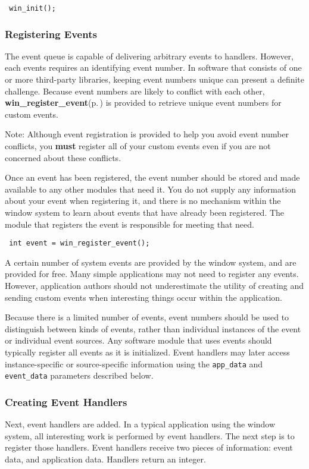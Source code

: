 \footnotesize\begin{verbatim} win_init();
\end{verbatim}
\normalsize
\subsubsection{Registering Events}\label{winevent_8h_regevent}
The event queue is capable of delivering arbitrary events to handlers. However, each events requires an identifying event number. In software that consists of one or more third-party libraries, keeping event numbers unique can present a definite challenge. Because event numbers are likely to conflict with each other, {\bf win\_\-register\_\-event}{\rm (p.\,\pageref{winevent_8h_a3})} is provided to retrieve unique event numbers for custom events.

\begin{Desc}
\item[Note:]Although event registration is provided to help you avoid event number conflicts, you {\bf must} register all of your custom events even if you are not concerned about these conflicts.\end{Desc}
Once an event has been registered, the event number should be stored and made available to any other modules that need it. You do not supply any information about your event when registering it, and there is no mechanism within the window system to learn about events that have already been registered. The module that registers the event is responsible for meeting that need.



\footnotesize\begin{verbatim} int event = win_register_event();
\end{verbatim}
\normalsize


A certain number of system events are provided by the window system, and are provided for free. Many simple applications may not need to register any events. However, application authors should not underestimate the utility of creating and sending custom events when interesting things occur within the application.

Because there is a limited number of events, event numbers should be used to distinguish between kinds of events, rather than individual instances of the event or individual event sources. Any software module that uses events should typically register all events as it is initialized. Event handlers may later access instance-specific or source-specific information using the {\tt app\_\-data} and {\tt event\_\-data} parameters described below.\subsubsection{Creating Event Handlers}\label{winevent_8h_createhandler}
Next, event handlers are added. In a typical application using the window system, all interesting work is performed by event handlers. The next step is to register those handlers. Event handlers receive two pieces of information: event data, and application data. Handlers return an integer.



